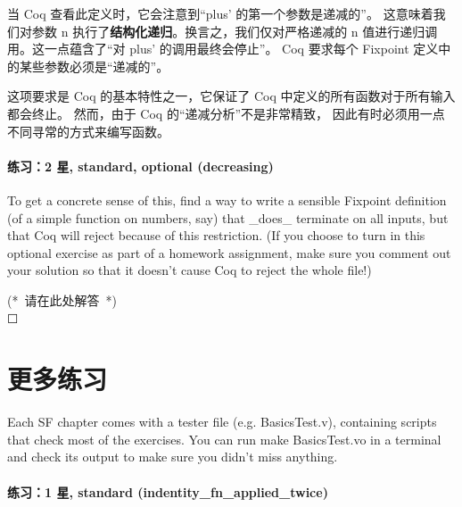 \documentclass[utf8]{ctexart}
\let\oldparagraph\paragraph
\renewcommand{\paragraph}[1]{\oldparagraph{#1}\mbox{}}
\begin{document}
当 Coq 查看此定义时，它会注意到``{{plus'}} 的第一个参数是递减的''。
这意味着我们对参数 {{n}}
执行了\textbf{结构化递归}。换言之，我们仅对严格递减的 {{n}}
值进行递归调用。这一点蕴含了``对 {{plus'}} 的调用最终会停止''。 Coq
要求每个 {{Fixpoint}} 定义中的某些参数必须是``递减的''。

这项要求是 Coq 的基本特性之一，它保证了 Coq
中定义的所有函数对于所有输入都会终止。 然而，由于 Coq
的``递减分析''不是非常精致，
因此有时必须用一点不同寻常的方式来编写函数。

\protect\hypertarget{lab42}{}{}

\hypertarget{ux7ec3ux4e602-ux661f-standard-optional-decreasing}{%
\paragraph{练习：2 星, standard, optional
(decreasing)}\label{ux7ec3ux4e602-ux661f-standard-optional-decreasing}}

To get a concrete sense of this, find a way to write a sensible
{{Fixpoint}} definition (of a simple function on numbers, say) that
\_does\_ terminate on all inputs, but that Coq will reject because of
this restriction. (If you choose to turn in this optional exercise as
part of a homework assignment, make sure you comment out your solution
so that it doesn't cause Coq to reject the whole file!)

{(*~请在此处解答~*)}\\

{☐}

\protect\hypertarget{lab43}{}{}

\hypertarget{ux66f4ux591aux7ec3ux4e60}{%
\section{更多练习}\label{ux66f4ux591aux7ec3ux4e60}}

Each SF chapter comes with a tester file (e.g. {{BasicsTest.v}}),
containing scripts that check most of the exercises. You can run
{{make}} {{BasicsTest.vo}} in a terminal and check its output to make
sure you didn't miss anything.

\protect\hypertarget{lab44}{}{}

\hypertarget{ux7ec3ux4e601-ux661f-standard-indentity_fn_applied_twice}{%
\paragraph{练习：1 星, standard
(indentity\_fn\_applied\_twice)}\label{ux7ec3ux4e601-ux661f-standard-indentity_fn_applied_twice}}
\end{document}
